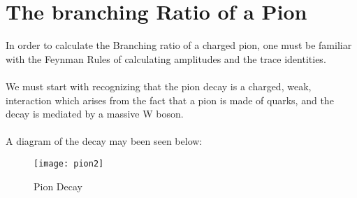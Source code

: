 \documentclass[12pt]{article}
\begin{document}
\section{The branching Ratio of a Pion}
In order to calculate the Branching ratio of a charged pion, one must be familiar with the Feynman Rules of calculating amplitudes and the trace identities. \\
\\
We must start with recognizing that the pion decay is a charged, weak, interaction which arises from the fact that a pion is made of quarks, and the decay is mediated by a massive W boson. \\
\\
A diagram of the decay may been seen below: 
\begin{figure}[h]
\centering
\texttt{[image: pion2]}
\caption{Pion Decay}
\end{figure}
\end{document}
